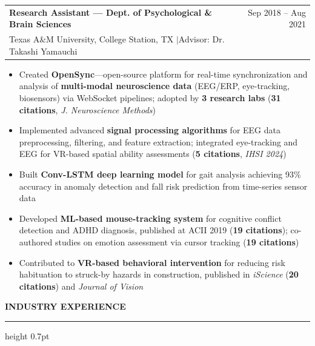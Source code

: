 \documentclass[11pt,letterpaper]{article}
\makeatletter
\newcommand{\cvsection}[1]{%
  \vspace{0.7em}%
  {\color{headerblue}\large\bfseries\MakeUppercase{#1}}%
  \vspace{0.12em}%
  {\color{rulecolor}\hrule height 0.7pt}%
  \vspace{0.35em}%
}
\newcommand{\cventry}[4]{%
  \noindent\begin{tabularx}{\textwidth}{@{}X r@{}}
    {\bfseries\color{headerblue}#1} & {\color{graytext}\small #2} \\
    {\color{accentcolor}\small #3} & \\
  \end{tabularx}%
  \vspace{0.02em}%
  #4%
  \vspace{0.25em}%
}
\makeatother
\begin{document}
\cventry{Research Assistant --- Dept. of Psychological \& Brain Sciences}{Sep 2018 -- Aug 2021}{Texas A\&M University, College Station, TX \enspace$\mid$\enspace Advisor: Dr. Takashi Yamauchi}{
\begin{itemize}[leftmargin=0.5cm, itemsep=0.05cm, topsep=0.06cm, label={\color{headerblue}\textbullet}]
  \item Created \textbf{OpenSync}---open-source platform for real-time synchronization and analysis of \textbf{multi-modal neuroscience data} (EEG/ERP, eye-tracking, biosensors) via WebSocket pipelines; adopted by \textbf{3 research labs} (\textbf{31 citations}, \textit{J. Neuroscience Methods})
  \item Implemented advanced \textbf{signal processing algorithms} for EEG data preprocessing, filtering, and feature extraction; integrated eye-tracking and EEG for VR-based spatial ability assessments (\textbf{5 citations}, \textit{IHSI 2024})
  \item Built \textbf{Conv-LSTM deep learning model} for gait analysis achieving 93\% accuracy in anomaly detection and fall risk prediction from time-series sensor data
  \item Developed \textbf{ML-based mouse-tracking system} for cognitive conflict detection and ADHD diagnosis, published at ACII 2019 (\textbf{19 citations}); co-authored studies on emotion assessment via cursor tracking (\textbf{19 citations})
  \item Contributed to \textbf{VR-based behavioral intervention} for reducing risk habituation to struck-by hazards in construction, published in \textit{iScience} (\textbf{20 citations}) and \textit{Journal of Vision}
\end{itemize}
}

\cvsection{Industry Experience}
\end{document}
